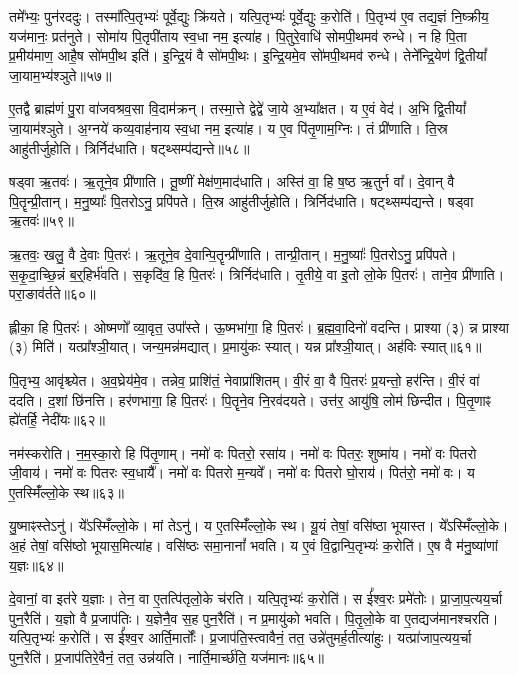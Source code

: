 तमे᳚भ्यः॒ पुन॑रददुः।
तस्मा᳚त्पि॒तृभ्यः॑ पूर्वे॒द्युः क्रि॑यते।
यत्पि॒तृभ्यः॑ पूर्वे॒द्युः क॒रोति॑।
पि॒तृभ्य॑ ए॒व तद्य॒ज्ञं नि॒ष्क्रीय॒ यज॑मानः॒ प्रत॑नुते।
सोमा॑य पि॒तृपी॑ताय स्व॒धा नम॒ इत्या॑ह।
पि॒तुरे॒वाधि॑ सोमपी॒थमव॑ रुन्धे।
न हि पि॒ता प्र॒मीय॑माण॒ आहै॒ष सो॑मपी॒थ इति॑।
इ॒न्द्रि॒यं वै सो॑मपी॒थः।
इ॒न्द्रि॒यमे॒व सो॑मपी॒थमव॑ रुन्धे।
तेने᳚न्द्रि॒येण॑ द्वि॒तीयां᳚ जा॒याम॒भ्य॑श्ञुते॥५७॥

ए॒तद्वै ब्राह्म॑णं पु॒रा वा॑जवश्रव॒सा वि॒दाम॑क्रन्।
तस्मा॒त्ते द्वेद्वे॑ जा॒ये अ॒भ्या᳚क्षत।
य ए॒वं वेद॑।
अ॒भि द्वि॒तीयां᳚ जा॒याम॑श्ञुते।
अ॒ग्नये॑ कव्य॒वाह॑नाय स्व॒धा नम॒ इत्या॑ह।
य ए॒व पि॑तृ॒णाम॒ग्निः।
तं प्री॑णाति।
ति॒स्र आहु॑तीर्जुहोति।
त्रिर्निद॑धाति।
षट्थ्सम्प॑द्यन्ते॥५८॥

षड्वा ऋ॒तवः॑।
ऋ॒तूने॒व प्री॑णाति।
तू॒ष्णीं मेक्ष॑ण॒माद॑धाति।
अस्ति॑ वा॒ हि ष॒ष्ठ ऋ॒तुर्न वा᳚।
दे॒वान् वै पि॒तॄन्प्री॒तान्।
म॒नु॒ष्याः᳚ पि॒तरोऽनु॒ प्रपि॑पते।
ति॒स्र आहु॑तीर्जुहोति।
त्रिर्निद॑धाति।
षट्थ्सम्प॑द्यन्ते।
षड्वा ऋ॒तवः॑॥५९॥

ऋ॒तवः॒ खलु॒ वै दे॒वाः पि॒तरः॑।
ऋ॒तूने॒व दे॒वान्पि॒तॄन्प्री॑णाति।
तान्प्री॒तान्।
म॒नु॒ष्याः᳚ पि॒तरोऽनु॒ प्रपि॑पते।
स॒कृ॒दा॒च्छि॒न्नं ब॒र्॒\mbox{}हिर्भ॑वति।
स॒कृदि॑व॒ हि पि॒तरः॑।
त्रिर्निद॑धाति।
तृ॒तीये॒ वा इ॒तो लो॒के पि॒तरः॑।
ताने॒व प्री॑णाति।
परा॒ङाव॑र्तते॥६०॥

ह्लीका॒ हि पि॒तरः॑।
ओष्मणो᳚ व्या॒वृत॒ उपा᳚स्ते।
ऊ॒ष्मभा॑गा॒ हि पि॒तरः॑।
ब्र॒ह्म॒वा॒दिनो॑ वदन्ति।
प्राश्या (३) न्न प्राश्या (३) मिति॑।
यत्प्रा᳚श्ञी॒यात्।
जन्य॒मन्न॑मद्यात्।
प्र॒मायु॑कः स्यात्।
यन्न प्रा᳚श्ञी॒यात्।
अह॑विः स्यात्॥६१॥

पि॒तृभ्य॒ आवृ॑श्च्येत।
अ॒व॒घ्रेय॑मे॒व।
तन्नेव॒ प्राशि॑तं॒ नेवाप्रा॑शितम्।
वी॒रं वा॒ वै पि॒तरः॑ प्र॒यन्तो॒ हर॑न्ति।
वी॒रं वा॑ ददति।
द॒शां छि॑नत्ति।
हर॑णभागा॒ हि पि॒तरः॑।
पि॒तॄने॒व नि॒रव॑दयते।
उत्त॑र॒ आयु॑षि॒ लोम॑ छिन्दीत।
पि॒तृ॒णाꣴ ह्ये॑तर्\mbox{}हि॒ नेदी॑यः॥६२॥

नम॑स्करोति।
न॒म॒स्का॒रो हि पि॑तृ॒णाम्।
नमो॑ वः पितरो॒ रसा॑य।
नमो॑ वः पितरः॒ शुष्मा॑य।
नमो॑ वः पितरो जी॒वाय॑।
नमो॑ वः पितरः स्व॒धायै᳚।
नमो॑ वः पितरो म॒न्यवे᳚।
नमो॑ वः पितरो घो॒राय॑।
पित॑रो॒ नमो॑ वः।
य ए॒तस्मिँ॑ल्लो॒के स्थ॥६३॥

यु॒ष्माꣴस्तेऽनु॑।
ये᳚ऽस्मिँल्लो॒के।
मां तेऽनु॑।
य ए॒तस्मिँ॑ल्लो॒के स्थ।
यू॒यं तेषां॒ वसि॑ष्ठा भूयास्त।
ये᳚ऽस्मिँल्लो॒के।
अ॒हं तेषां॒ वसि॑ष्ठो भूयास॒मित्या॑ह।
वसि॑ष्ठः समा॒नानां᳚ भवति।
य ए॒वं वि॒द्वान्पि॒तृभ्यः॑ क॒रोति॑।
ए॒ष वै म॑नु॒ष्या॑णां य॒ज्ञः॥६४॥

दे॒वानां॒ वा इत॑रे य॒ज्ञाः।
तेन॒ वा ए॒तत्पि॑तृलो॒के च॑रति।
यत्पि॒तृभ्यः॑ क॒रोति॑।
स ई᳚श्व॒रः प्रमे॑तोः।
प्रा॒जा॒प॒त्यय॒र्चा पुन॒रैति॑।
य॒ज्ञो वै प्र॒जा\-प॑तिः।
य॒ज्ञेनै॒व स॒ह पुन॒रैति॑।
न प्र॒मायु॑को भवति।
पि॒तृ॒लो॒के वा ए॒तद्यज॑मानश्चरति।
यत्पि॒तृभ्यः॑ क॒रोति॑।
स ई᳚श्व॒र आर्ति॒मार्तोः᳚।
प्र॒जा\-प॑ति॒स्त्वावैनं॒ तत॒ उन्ने॑तुमर्\mbox{}ह॒तीत्या॑हुः।
यत्प्रा॑जाप॒त्यय॒र्चा पुन॒रैति॑।
प्र॒जा\-प॑तिरे॒वैनं॒ तत॒ उन्न॑यति।
नार्ति॒मार्च्छ॑ति॒ यज॑मानः॥६५॥\anuvakamend[इत्य॑श्ञुते पद्यन्ते पद्यन्ते॒ षड्वा ऋ॒तवो॑ वर्त॒ते\-ऽह॑विः स्या॒न्नेदी॑यः॒ स्थ य॒ज्ञो यज॑मानश्चरति॒ यत्पि॒तृभ्यः॑ क॒रोति॒ पञ्च॑ च]




